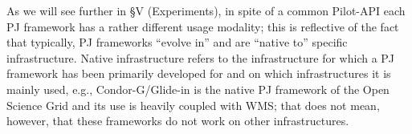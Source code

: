 \documentclass{sig-alternate}
\begin{document}
As we will see further in \S V (Experiments), in spite of a common
Pilot-API each PJ framework has a rather different usage modality;
this is reflective of the fact that typically, PJ frameworks ``evolve
in'' and are ``native to'' specific infrastructure. Native
infrastructure refers to the infrastructure for which a PJ framework
has been primarily developed for and on which infrastructures it is
mainly used, e.g., Condor-G/Glide-in is the native PJ framework of the
Open Science Grid and its use is heavily coupled with WMS; that does
not mean, however, that these frameworks do not work on other
infrastructures.










% 


\end{document}
